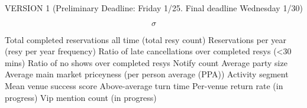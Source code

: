 VERSION 1 (Preliminary Deadline: Friday 1/25. Final deadline Wednesday 1/30)   

 \begin{equation}
 \sigma
 \end{equation}
 
Total completed reservations all time (total resy count)  
Reservations per year (resy per year frequency)  
Ratio of late cancellations over completed resys (<30 mins)  
Ratio of no shows over completed resys  
Notify count  
Average party size  
Average main market priceyness (per person average (PPA))  
Activity segment  
Mean venue success score  
Above-average turn time  
Per-venue return rate (in progress)    
Vip mention count (in progress)  

